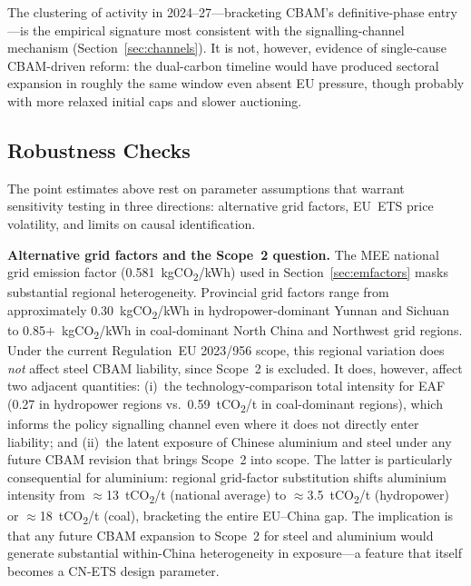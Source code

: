 \documentclass[letterpaper, 10pt, conference]{ieeeconf}
\begin{document}
The clustering of activity in 2024--27---bracketing CBAM's
definitive-phase entry---is the empirical signature most consistent
with the signalling-channel mechanism (Section~\ref{sec:channels}).
It is not, however, evidence of single-cause CBAM-driven reform: the
dual-carbon timeline would have produced sectoral expansion in
roughly the same window even absent EU pressure, though probably with
more relaxed initial caps and slower auctioning.

\subsection{Robustness Checks}
\label{sec:robustness}

The point estimates above rest on parameter assumptions that warrant
sensitivity testing in three directions: alternative grid factors,
EU~ETS price volatility, and limits on causal identification.

\textbf{Alternative grid factors and the Scope~2 question.} The MEE
national grid emission factor (0.581~kgCO\textsubscript{2}/kWh) used
in Section~\ref{sec:emfactors} masks substantial regional
heterogeneity. Provincial grid factors range from approximately
0.30~kgCO\textsubscript{2}/kWh in hydropower-dominant Yunnan and
Sichuan to 0.85$+$~kgCO\textsubscript{2}/kWh in coal-dominant North
China and Northwest grid regions. Under the current Regulation~EU
2023/956 scope, this regional variation does \emph{not} affect steel
CBAM liability, since Scope~2 is excluded. It does, however, affect
two adjacent quantities: (i)~the technology-comparison total
intensity for EAF (0.27 in hydropower regions vs.\
0.59~tCO\textsubscript{2}/t in coal-dominant regions), which informs
the policy signalling channel even where it does not directly enter
liability; and (ii)~the latent exposure of Chinese aluminium and
steel under any future CBAM revision that brings Scope~2 into scope.
The latter is particularly consequential for aluminium: regional
grid-factor substitution shifts aluminium intensity from
$\approx$13~tCO\textsubscript{2}/t (national average) to
$\approx$3.5~tCO\textsubscript{2}/t (hydropower) or
$\approx$18~tCO\textsubscript{2}/t (coal), bracketing the entire
EU--China gap. The implication is that any future CBAM expansion to
Scope~2 for steel and aluminium would generate substantial
within-China heterogeneity in exposure---a feature that itself
becomes a CN-ETS design parameter.
\end{document}
